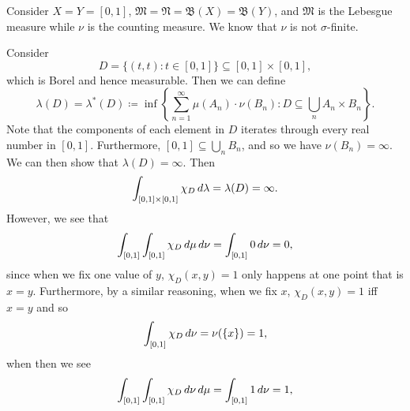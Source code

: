 \documentclass[notoc,notitlepage]{tufte-book}
\begin{document}
\begin{eg}
  Consider $X = Y = [0, 1]$,
  $\mathfrak{M} = \mathfrak{N} = \mathfrak{B}(X) = \mathfrak{B}(Y)$,
  and $\mathfrak{M}$ is the Lebesgue measure
  while $\nu$ is the counting measure.
  We know that $\nu$ is not $\sigma$-finite.

  Consider
  \begin{equation*}
    D = \{ (t, t) : t \in [0, 1] \} \subseteq [0, 1] \times [0, 1],
  \end{equation*}
  which is Borel and hence measurable.
  Then we can define
  \begin{equation*}
    \lambda(D) = \lambda^*(D) \coloneqq \inf \left\{ 
      \sum_{n=1}^{\infty} \mu(A_n) \cdot \nu(B_n)
      : D \subseteq \bigcup_{n} A_n \times B_n
    \right\}.
  \end{equation*}
  Note that the components of each element in $D$ iterates through
  every real number in $[0, 1]$.
  Furthermore, $[0, 1] \subseteq \bigcup_{n} B_n$,
  and so we have $\nu(B_n) = \infty$.
  We can then show that $\lambda(D) = \infty$.
  Then
  \begin{equation*}
    \int_{[0, 1] \times [0, 1]} \chi_D \mathop{}\!d{\lambda} = \lambda(D) = \infty.
  \end{equation*}
  However, we see that
  \begin{equation*}
    \int_{[0, 1]} \int_{[0, 1]} \chi_D \mathop{}\!d{\mu} \mathop{}\!d{\nu}
    = \int_{[0, 1]} 0 \mathop{}\!d{\nu} = 0,
  \end{equation*}
  since when we fix one value of $y$, $\chi_D(x, y) = 1$ only happens
  at one point that is $x = y$.
  Furthermore, by a similar reasoning, when we fix $x$, $\chi_D(x, y) = 1$
  iff $x = y$ and so
  \begin{equation*}
    \int_{[0, 1]} \chi_D \mathop{}\!d{\nu} = \nu(\{x\}) = 1,
  \end{equation*}
  when then we see
  \begin{equation*}
    \int_{[0, 1]} \int_{[0, 1]} \chi_D \mathop{}\!d{\nu} \mathop{}\!d{\mu}
    = \int_{[0, 1]} 1 \mathop{}\!d{\nu} = 1,
  \end{equation*}
\end{eg}
\end{document}
